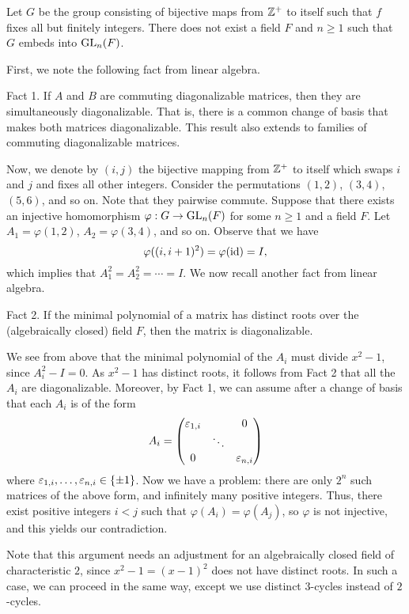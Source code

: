 \begin{exmp}{}
Let $G$ be the group consisting of bijective maps from $\mathbb{Z}^+$ to itself such that $f$ fixes all
but finitely integers. There does not exist a field $F$ and $n \geq 1$ such that 
$G$ embeds into $\operatorname{GL}_n(F)$. 
\end{exmp}
\begin{pf} 
First, we note the following fact from linear algebra.

{\sc Fact 1.} If $A$ and $B$ are commuting diagonalizable matrices, then they are simultaneously 
diagonalizable. That is, there is a common change of basis that makes both matrices diagonalizable.
This result also extends to families of commuting diagonalizable matrices. 

Now, we denote by $(i, j)$ the bijective mapping from $\mathbb{Z}^+$ to itself which swaps $i$ and $j$ 
and fixes all other integers. Consider the permutations $(1, 2)$, $(3, 4)$, $(5, 6)$, and so on. 
Note that they pairwise commute. Suppose that there exists an injective homomorphism 
$\varphi: G \to \operatorname{GL}_n(F)$ for some $n \geq 1$ and a field $F$. Let $A_1 = \varphi(1, 2)$, 
$A_2 = \varphi(3, 4)$, and so on. Observe that we have 
\[ \varphi((i, i+1)^2) = \varphi(\operatorname{id}) = I, \]
which implies that $A_1^2 = A_2^2 = \cdots = I$. We now recall another fact from linear algebra. 

{\sc Fact 2.} If the minimal polynomial of a matrix has distinct roots over the (algebraically closed) field $F$, then the matrix is diagonalizable. 

We see from above that the minimal polynomial of the $A_i$ must divide $x^2 - 1$, since 
$A_i^2 - I = 0$. As $x^2 - 1$ has distinct roots, it follows from Fact 2 that all the $A_i$ are diagonalizable. Moreover, by Fact 1, we can assume after a change of basis that each $A_i$ is of the form 
\[ A_i = \begin{pmatrix} \varepsilon_{1,i} & & 0 \\ & \ddots & \\ 0 & & \varepsilon_{n,i} \end{pmatrix} \]
where $\varepsilon_{1,i}, \dots, \varepsilon_{n,i} \in \{\pm 1\}$. Now we have a problem: there are only 
$2^n$ such matrices of the above form, and infinitely many positive integers. Thus, there 
exist positive integers $i < j$ such that $\varphi(A_i) = \varphi(A_j)$, so 
$\varphi$ is not injective, and this yields our contradiction.

Note that this argument needs an adjustment for an algebraically closed field of characteristic $2$, 
since $x^2 - 1 = (x - 1)^2$ does not have distinct roots. 
In such a case, we can proceed in the same way, except we use distinct $3$-cycles instead of $2$-cycles.
\end{pf}

